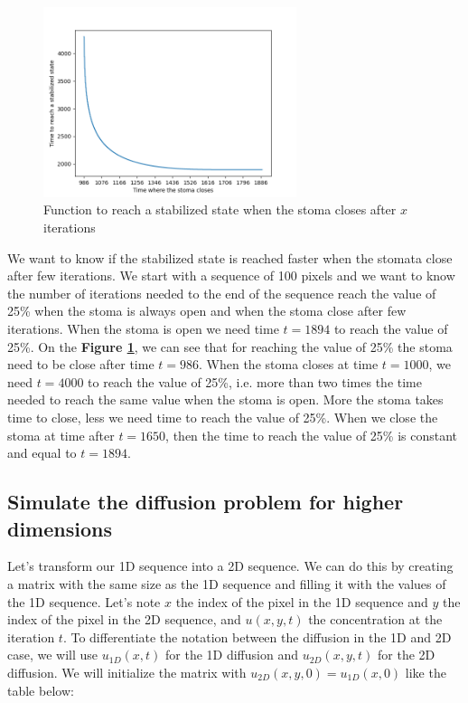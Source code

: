 \begin{figure}[htb]
    \center
    \includegraphics[width=0.66\textwidth]{figures/function_to_reach_a_stabilized_state_when_the_stoma_closes.png}
    \caption{Function to reach a stabilized state when the stoma closes after $x$ iterations}
    \label{fig:s_time_close}
\end{figure}

We want to know if the stabilized state is reached faster when the stomata close after
few iterations. We start with a sequence of 100 pixels and we want to know the number
of iterations needed to the end of the sequence reach the value of 25\% when the stoma
is always open and when the stoma close after few iterations. When the stoma is open
we need time $t=1894$ to reach the value of 25\%. On the \textbf{Figure 
\ref{fig:s_time_close}}, we can see that for reaching the value of 25\% the stoma
need to be close after time $t=986$. When the stoma closes at time $t=1000$, we need 
$t=4000$ to reach the value of 25\%, i.e. more than two times the time needed to reach
the same value when the stoma is open. More the stoma takes time to close, less we 
need time to reach the value of 25\%. When we close the stoma at time after $t=1650$,
then the time to reach the value of 25\% is constant and equal to $t=1894$.

\subsection{Simulate the diffusion problem for higher dimensions}

Let's transform our 1D sequence into a 2D sequence. We can do this by creating a
matrix with the same size as the 1D sequence and filling it with the values of the 
1D sequence. Let's note $x$ the index of the pixel in the 1D sequence and $y$ the index 
of the pixel in the 2D sequence, and $u(x,y,t)$ the concentration at the iteration $t$.
To differentiate the notation between the diffusion in the 1D and 2D case, we will use
$u_{1D}(x,t)$ for the 1D diffusion and $u_{2D}(x,y,t)$ for the 2D diffusion.
We will initialize the matrix with $u_{2D}(x,y,0) = u_{1D}(x,0)$ like the table below:

